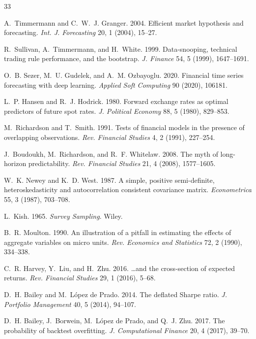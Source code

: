 \documentclass[sigconf,nonacm]{acmart}
\begin{document}

\begin{thebibliography}{33}

 A.~Timmermann and C.~W.~J. Granger. 2004. Efficient
market hypothesis and forecasting. \emph{Int. J. Forecasting} 20, 1 (2004),
15--27.

 R.~Sullivan, A.~Timmermann, and H.~White. 1999.
Data-snooping, technical trading rule performance, and the bootstrap. \emph{J.
Finance} 54, 5 (1999), 1647--1691.

 O.~B. Sezer, M.~U. Gudelek, and A.~M. Ozbayoglu. 2020.
Financial time series forecasting with deep learning. \emph{Applied Soft
Computing} 90 (2020), 106181.

 L.~P. Hansen and R.~J. Hodrick. 1980. Forward exchange
rates as optimal predictors of future spot rates. \emph{J. Political Economy}
88, 5 (1980), 829--853.

 M.~Richardson and T.~Smith. 1991. Tests of financial
models in the presence of overlapping observations. \emph{Rev. Financial
Studies} 4, 2 (1991), 227--254.

 J.~Boudoukh, M.~Richardson, and R.~F. Whitelaw. 2008. The
myth of long-horizon predictability. \emph{Rev. Financial Studies} 21, 4 (2008),
1577--1605.

 W.~K. Newey and K.~D. West. 1987. A simple, positive
semi-definite, heteroskedasticity and autocorrelation consistent covariance
matrix. \emph{Econometrica} 55, 3 (1987), 703--708.

 L.~Kish. 1965. \emph{Survey Sampling}. Wiley.

 B.~R. Moulton. 1990. An illustration of a pitfall in
estimating the effects of aggregate variables on micro units. \emph{Rev.
Economics and Statistics} 72, 2 (1990), 334--338.

 C.~R. Harvey, Y.~Liu, and H.~Zhu. 2016. \ldots and the
cross-section of expected returns. \emph{Rev. Financial Studies} 29, 1 (2016),
5--68.

 D.~H. Bailey and M.~L\'opez de Prado. 2014. The deflated
Sharpe ratio. \emph{J. Portfolio Management} 40, 5 (2014), 94--107.

 D.~H. Bailey, J.~Borwein, M.~L\'opez de Prado, and Q.~J.
Zhu. 2017. The probability of backtest overfitting. \emph{J. Computational
Finance} 20, 4 (2017), 39--70.


\end{thebibliography}
\end{document}

